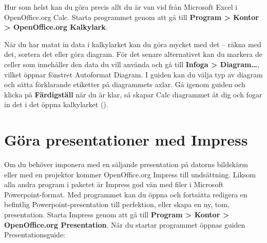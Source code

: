 \documentclass[a4paper,final]{memoir} %
\begin{document}
Hur som helst kan du göra precis allt du är van vid från Microsoft Excel i OpenOffice.org Calc. Starta programmet genom att gå till \textbf{Program \textgreater{} Kontor \textgreater{} OpenOffice.org Kalkylark}.

När du har matat in data i kalkylarket kan du göra mycket med det -- räkna med det, sortera det eller göra diagram. För det senare alternativet kan du markera de celler som innehåller den data du vill använda och gå till \textbf{Infoga \textgreater{} Diagram\ldots{}}, vilket öppnar fönstret Autoformat Diagram. I guiden kan du välja typ av diagram och sätta förklarande etiketter på diagrammets axlar. Gå igenom guiden och klicka på \textbf{Färdigställ} när du är klar, så skapar Calc diagrammet åt dig och fogar in det i det öppna kalkylarket ().



\section{Göra presentationer med Impress}


Om du behöver imponera med en säljande presentation på datorns bildskärm eller med en projektor kommer OpenOffice.org Impress till undsättning. Liksom alla andra program i paketet är Impress god vän med filer i Microsoft Powerpoint-format. Med programmet kan du öppna och fortsätta redigera en befintlig Powerpoint-presentation till perfektion, eller skapa en ny, tom, presentation. Starta Impress genom att gå till \textbf{Program \textgreater{} Kontor \textgreater{} OpenOffice.org Presentation}. När du startar programmet öppnas guiden Presentationsguide:
\end{document}
